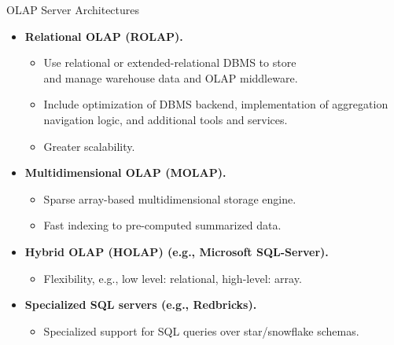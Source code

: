\begin{frame}{OLAP Server Architectures}
	\begin{itemize}
		\item \textbf{Relational OLAP (ROLAP).}
		      \begin{itemize}
			      \item Use relational or extended-relational DBMS to store \\
			            and manage warehouse data and OLAP middleware.
			      \item Include optimization of DBMS backend, implementation of aggregation navigation logic, and additional tools and services.
			      \item Greater scalability.
		      \end{itemize}
		\item \textbf{Multidimensional OLAP (MOLAP).}
		      \begin{itemize}
			      \item Sparse array-based multidimensional storage engine.
			      \item Fast indexing to pre-computed summarized data.
		      \end{itemize}
		\item \textbf{Hybrid OLAP (HOLAP) (e.g., Microsoft SQL-Server).}
		      \begin{itemize}
			      \item Flexibility, e.g., low level: relational, high-level: array.
		      \end{itemize}
		\item \textbf{Specialized SQL servers (e.g., Redbricks).}
		      \begin{itemize}
			      \item Specialized support for SQL queries over star/snowflake schemas.
		      \end{itemize}
	\end{itemize}
\end{frame}
